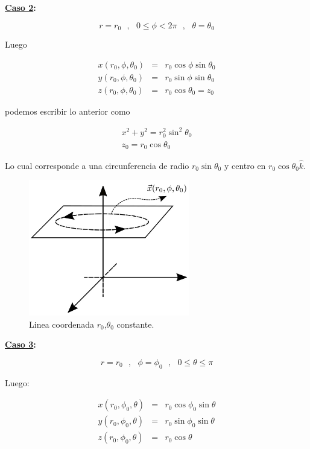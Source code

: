 \documentclass[12pt]{report}
\begin{document}
\textbf{\underline{Caso 2}:}

\begin{equation} \nonumber
r=r_0 \ \ \ , \ \ \  0 \leq \phi < 2\pi \ \ \ , \ \ \ \theta= \theta_0 
\end{equation}

Luego

\begin{eqnarray} \nonumber
x(r_0,\phi,\theta_0)&=& r_0 \cos{\phi}\sin{\theta_0} \\ \label{2.17}
y(r_0,\phi,\theta_0)&=& r_0 \sin{\phi}\sin{\theta_0}  \\ \nonumber
z(r_0,\phi,\theta_0)&=& r_0 \cos{\theta_0}= z_0
\end{eqnarray}

podemos escribir lo anterior como

\begin{eqnarray}
x^2 + y^2 = r_{0}^2 \sin^2{\theta_0} \\ \nonumber
z_{0} = r_0 \cos{\theta_0} 
\end{eqnarray}

Lo cual corresponde a una circunferencia de radio $r_0 \sin{\theta_0}$ y  centro en $r_0 \cos{\theta_0} \hat{k}$. 


\begin{figure}[H]
	\centering
	\includegraphics[width=7cm]{figura52.png}
	\caption{ Linea coordenada $r_0$,$\theta_0$ constante.}
	\label{fig.1}
\end{figure}

\textbf{\underline{Caso 3}:}

\begin{equation} \nonumber
r=r_0 \ \ \ , \ \ \  \phi=\phi_0 \ \ \ , \ \ \ 0 \leq \theta \leq \pi 
\end{equation}

Luego:

\begin{eqnarray} \nonumber
x(r_0,\phi_0,\theta) &=& r_0 \cos{\phi_0}\sin{\theta} \\ \label{2.19}
y(r_0,\phi_0,\theta) &=& r_0 \sin{\phi_0}\sin{\theta} \\ \nonumber
z(r_0,\phi_0,\theta) &=& r_0 \cos{\theta}
\end{eqnarray}
\end{document}

